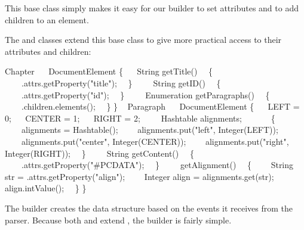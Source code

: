 This base class simply makes it easy for our builder to set attributes and to add children to an element.

The  and  classes extend this base class to give more practical access to their attributes and children:

\begin{example}
 Chapter
~~ DocumentElement
\{
~~ String getTitle()
~~\{
~~~~.attrs.getProperty("title");
~~\}
~
~~ String getID()
~~\{
~~~~.attrs.getProperty("id");
~~\}
~
~~ Enumeration getParagraphs()
~~\{
~~~~.children.elements();
~~\}
\}
~
 Paragraph
~~ DocumentElement
\{
~~ LEFT = 0;
~~ CENTER = 1;
~~ RIGHT = 2;
~
~~ Hashtable alignments;
~
~~
~~\{
~~~~alignments =  Hashtable();
~~~~alignments.put("left",  Integer(LEFT));
~~~~alignments.put("center",  Integer(CENTER));
~~~~alignments.put("right",  Integer(RIGHT));
~~\}
~
~~ String getContent()
~~\{
~~~~.attrs.getProperty("\#PCDATA");
~~\}
~
~~ getAlignment()
~~\{
~~~~String str = .attrs.getProperty("align");
~~~~Integer align = alignments.get(str);
~~~~ align.intValue();
~~\}
\}
\end{example}

The builder creates the data structure based on the \XML{} events it receives from the parser.
Because both  and  extend , the builder is fairly simple.

